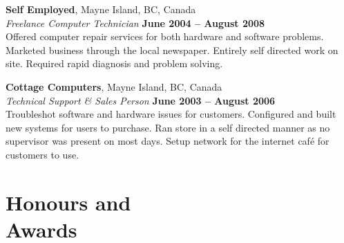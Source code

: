 \documentclass[margin,line]{resume}
\begin{document}
\begin{resume}
    \textbf{Self Employed}, Mayne Island, BC, Canada \vspace{2mm}\\\vspace{1mm}%
    \textsl{Freelance Computer Technician} \hfill \textbf{June 2004 -- August 2008}\\
    {\small
    Offered computer repair services for both hardware and software problems.
    Marketed business through the local newspaper.
    Entirely self directed work on site.
    Required rapid diagnosis and problem solving.}

    \textbf{Cottage Computers}, Mayne Island, BC, Canada \vspace{2mm}\\\vspace{1mm}%
    \textsl{Technical Support \& Sales Person} \hfill \textbf{June 2003 -- August 2006}\\
    {\small
    Troubleshot software and hardware issues for customers. Configured and built new systems for users to purchase.
    Ran store in a self directed manner as no supervisor was present on most days.
    Setup network for the internet caf\'{e} for customers to use.}
    \vspace{2mm}

    
    \section{\mysidestyle Honours and\\Awards} 


\end{resume}
\end{document}
